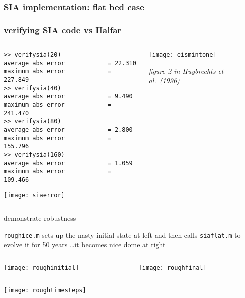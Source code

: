 \begin{frame}
  \frametitle{SIA implementation: flat bed case}


\end{frame}


\begin{frame}[fragile]
\frametitle{verifying SIA code vs Halfar}
\label{slide:verifysia}

\begin{columns}
\begin{column}{0.6\textwidth}
\scriptsize
\begin{verbatim}
>> verifysia(20)
average abs error            = 22.310
maximum abs error            = 227.849
>> verifysia(40)
average abs error            = 9.490
maximum abs error            = 241.470
>> verifysia(80)
average abs error            = 2.800
maximum abs error            = 155.796
>> verifysia(160)
average abs error            = 1.059
maximum abs error            = 109.466
\end{verbatim}
\normalsize

\texttt{[image: siaerror]}
\end{column}

\begin{column}{0.4\textwidth}
\vspace{4cm}

\texttt{[image: eismintone]}

\scriptsize \emph{figure 2 in Huybrechts et al.~(1996)}
\end{column}
\end{columns}
\end{frame}


\begin{frame}{demonstrate robustness}

\texttt{roughice.m} sets-up the nasty initial state at left and then calls \texttt{siaflat.m} to evolve it for 50 years \dots it becomes nice dome at right
\medskip

\begin{columns}
\begin{column}{0.5\textwidth}
\texttt{[image: roughinitial]}
\end{column}
\begin{column}{0.5\textwidth}
\texttt{[image: roughfinal]}
\end{column}
\end{columns}

\begin{center}
\texttt{[image: roughtimesteps]}
\end{center}
\end{frame}


